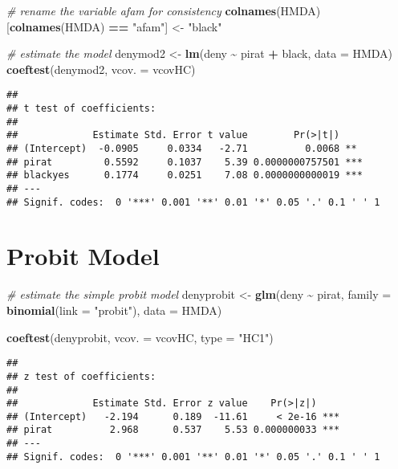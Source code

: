 \documentclass[
]{article}
\newenvironment{Shaded}{\begin{snugshade}}{\end{snugshade}}
\newcommand{\CommentTok}[1]{\textcolor[rgb]{0.56,0.35,0.01}{\textit{#1}}}
\newcommand{\DataTypeTok}[1]{\textcolor[rgb]{0.13,0.29,0.53}{#1}}
\newcommand{\KeywordTok}[1]{\textcolor[rgb]{0.13,0.29,0.53}{\textbf{#1}}}
\newcommand{\NormalTok}[1]{#1}
\newcommand{\OperatorTok}[1]{\textcolor[rgb]{0.81,0.36,0.00}{\textbf{#1}}}
\newcommand{\StringTok}[1]{\textcolor[rgb]{0.31,0.60,0.02}{#1}}
\begin{document}
\begin{Shaded}
\begin{Highlighting}[]
\CommentTok{\# rename the variable \textquotesingle{}afam\textquotesingle{} for consistency}
\KeywordTok{colnames}\NormalTok{(HMDA)[}\KeywordTok{colnames}\NormalTok{(HMDA) }\OperatorTok{==}\StringTok{ "afam"}\NormalTok{] \textless{}{-}}\StringTok{ "black"}

\CommentTok{\# estimate the model}
\NormalTok{denymod2 \textless{}{-}}\StringTok{ }\KeywordTok{lm}\NormalTok{(deny }\OperatorTok{\textasciitilde{}}\StringTok{ }\NormalTok{pirat }\OperatorTok{+}\StringTok{ }\NormalTok{black, }\DataTypeTok{data =}\NormalTok{ HMDA)}
\KeywordTok{coeftest}\NormalTok{(denymod2, }\DataTypeTok{vcov. =}\NormalTok{ vcovHC)}
\end{Highlighting}
\end{Shaded}

\begin{verbatim}
## 
## t test of coefficients:
## 
##             Estimate Std. Error t value        Pr(>|t|)    
## (Intercept)  -0.0905     0.0334   -2.71          0.0068 ** 
## pirat         0.5592     0.1037    5.39 0.0000000757501 ***
## blackyes      0.1774     0.0251    7.08 0.0000000000019 ***
## ---
## Signif. codes:  0 '***' 0.001 '**' 0.01 '*' 0.05 '.' 0.1 ' ' 1
\end{verbatim}

\hypertarget{probit-model}{%
\section{Probit Model}\label{probit-model}}

\begin{Shaded}
\begin{Highlighting}[]
\CommentTok{\# estimate the simple probit model}
\NormalTok{denyprobit \textless{}{-}}\StringTok{ }\KeywordTok{glm}\NormalTok{(deny }\OperatorTok{\textasciitilde{}}\StringTok{ }\NormalTok{pirat, }
                  \DataTypeTok{family =} \KeywordTok{binomial}\NormalTok{(}\DataTypeTok{link =} \StringTok{"probit"}\NormalTok{), }
                  \DataTypeTok{data =}\NormalTok{ HMDA)}

\KeywordTok{coeftest}\NormalTok{(denyprobit, }\DataTypeTok{vcov. =}\NormalTok{ vcovHC, }\DataTypeTok{type =} \StringTok{"HC1"}\NormalTok{)}
\end{Highlighting}
\end{Shaded}

\begin{verbatim}
## 
## z test of coefficients:
## 
##             Estimate Std. Error z value    Pr(>|z|)    
## (Intercept)   -2.194      0.189  -11.61     < 2e-16 ***
## pirat          2.968      0.537    5.53 0.000000033 ***
## ---
## Signif. codes:  0 '***' 0.001 '**' 0.01 '*' 0.05 '.' 0.1 ' ' 1
\end{verbatim}
\end{document}
